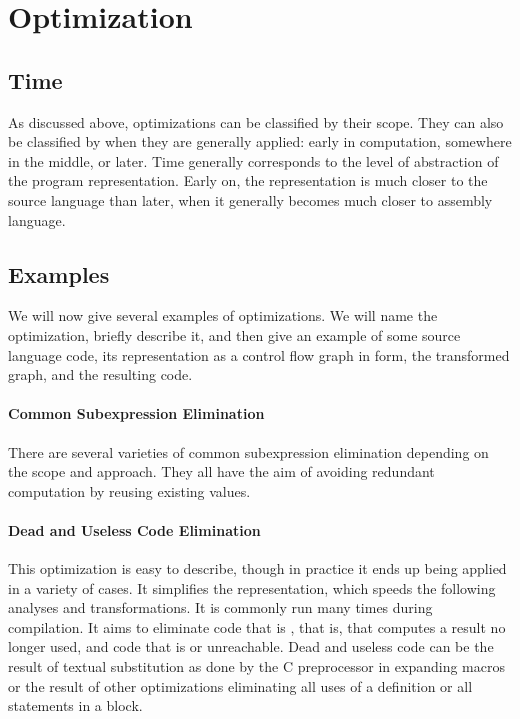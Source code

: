 \section{Optimization}
\subsection{Time}
As discussed above, optimizations can be classified by their scope. They can also be classified by when they are generally applied: early in computation, somewhere in the middle, or later. Time generally corresponds to the level of abstraction of the program representation. Early on, the representation is much closer to the source language than later, when it generally becomes much closer to assembly language.

\subsection{Examples}
We will now give several examples of optimizations. We will name the optimization, briefly describe it, and then give an example of some source language code, its representation as a control flow graph in \SSA form, the transformed graph, and the resulting code.
\paragraph{Common Subexpression Elimination}
There are several varieties of common subexpression elimination depending on the scope and approach. They all have the aim of avoiding redundant computation by reusing existing values.

\paragraph{Dead and Useless Code Elimination}
This optimization is easy to describe, though in practice it ends up being applied in a variety of cases. It simplifies the representation, which speeds the following analyses and transformations. It is commonly run many times during compilation. It aims to eliminate code that is , that is, that computes a result no longer used, and code that is  or unreachable. Dead and useless code can be the result of textual substitution as done by the C preprocessor in expanding macros or the result of other optimizations eliminating all uses of a definition or all statements in a block.
%
%
%
%

